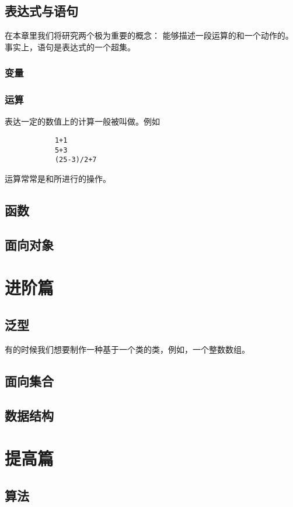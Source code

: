 \documentclass[a4paper]{tufte-book}
\begin{document}
	\chapter{表达式与语句}
		在本章里我们将研究两个极为重要的概念：
		能够描述一段运算的和一个动作的。
		事实上，语句是表达式的一个超集。
		\section{变量}
			
		\section{运算}
			表达一定的数值上的计算一般被叫做。例如
			\begin{verbatim}
			1+1
			5+3
			(25-3)/2+7
			\end{verbatim}
			运算常常是和所进行的操作。
			
	\chapter{函数}
	\chapter{面向对象}
	
\part{进阶篇}
	\chapter{泛型}
		有的时候我们想要制作一种基于一个类的类，例如，一个整数数组。
		
	\chapter{面向集合}
	\chapter{数据结构}
	
\part{提高篇}
	\chapter{算法}
\end{document}
